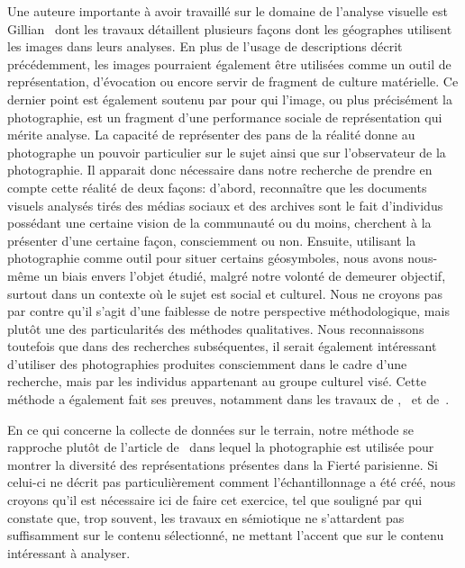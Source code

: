 Une auteure importante à avoir travaillé sur le domaine de l'analyse visuelle est Gillian~\citet{Rose2008} dont les travaux détaillent plusieurs façons dont les géographes utilisent les images dans leurs analyses. 
En plus de l'usage de descriptions décrit précédemment, les images pourraient également être utilisées comme un outil de représentation, d'évocation ou encore servir de fragment de culture matérielle. 
Ce dernier point est également soutenu par \citet{Frosh2001} pour qui l'image, ou plus précisément la photographie, est un fragment d'une performance sociale de représentation qui mérite analyse. 
La capacité de représenter des pans de la réalité donne au photographe un pouvoir particulier sur le sujet ainsi que sur l'observateur de la photographie.
Il apparait donc nécessaire dans notre recherche de prendre en compte cette réalité de deux façons: d'abord, reconnaître que les documents visuels analysés tirés des médias sociaux et des archives sont le fait d'individus possédant une certaine vision de la communauté \lgbt{} ou du moins, cherchent à la présenter d'une certaine façon, consciemment ou non. 
Ensuite, utilisant la photographie comme outil pour situer certains géosymboles, nous avons nous-même un biais envers l'objet étudié, malgré notre volonté de demeurer objectif, surtout dans un contexte où le sujet est social et culturel. 
Nous ne croyons pas par contre qu'il s'agit d'une faiblesse de notre perspective méthodologique, mais plutôt une des particularités des méthodes qualitatives. 
Nous reconnaissons toutefois que dans des recherches subséquentes, il serait également intéressant d'utiliser des photographies produites consciemment dans le cadre d'une recherche, mais par les individus appartenant au groupe culturel visé. 
Cette méthode a également fait ses preuves, notamment dans les travaux de \citet{Kwan2008},~\citet{Moore2008} et de~\citet{Markwell2000}.

En ce qui concerne la collecte de données sur le terrain, notre méthode se rapproche plutôt de l'article de~\citet{Leroy2010} dans lequel la photographie est utilisée pour montrer la diversité des représentations présentes dans la Fierté parisienne. 
Si celui-ci ne décrit pas particulièrement comment l'échantillonnage a été créé, nous croyons qu'il est nécessaire ici de faire cet exercice, tel que souligné par \citet[109]{Rose2012} qui constate que, trop souvent, les travaux en sémiotique ne s'attardent pas suffisamment sur le contenu sélectionné, ne mettant l'accent que sur le contenu intéressant à analyser.


